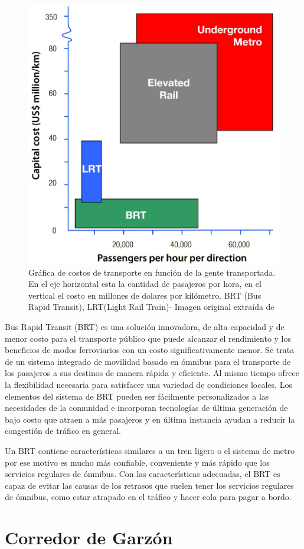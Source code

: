 \begin{figure}[H]
	\centering
	\includegraphics[width=0.5\linewidth]{Figures/costo_transporte}
	\caption{Gráfica de costos de transporte en función de la gente transportada. En el eje horizontal esta la cantidad de pasajeros por hora, en el vertical el costo en millones de dolares por kilómetro.  BRT (Bus Rapid Transit), LRT(Light Rail Train)- Imagen original extraída de \citep{ITDP}		
	}
	\label{fig:Grafica de costos de otros medios de transporte}
\end{figure}

Bus Rapid Transit (BRT) es una solución innovadora, de alta capacidad y de menor costo para el transporte público que puede alcanzar el rendimiento y los beneficios de modos ferroviarios con un costo significativamente menor. Se trata de un sistema integrado de movilidad basado en ómnibus para el transporte de los pasajeros a sus destinos de manera rápida y eficiente. Al mismo tiempo ofrece la flexibilidad necesaria para satisfacer una variedad de condiciones locales. Los elementos del sistema de BRT pueden ser fácilmente personalizados a las necesidades de la comunidad e incorporan tecnologías de última generación de bajo costo que atraen a más pasajeros y en última instancia ayudan a reducir la congestión de tráfico en general.

Un BRT contiene características similares a un tren ligero o el sistema de metro por ese motivo es mucho más confiable, conveniente y más rápido que los servicios regulares de ómnibus. Con las características adecuadas, el BRT es capaz de evitar las causas de los retrasos que suelen tener los servicios regulares de ómnibus, como estar atrapado en el tráfico y hacer cola para pagar a bordo. 


	
\section{Corredor de Garzón}	


